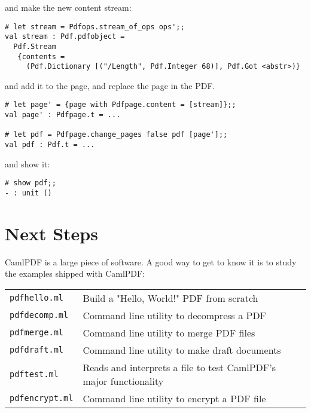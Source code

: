 \documentclass[a4paper]{memoir}
\newcommand{\smallgap}{\vspace{4mm}}
\begin{document}
\noindent and make the new content stream:

\begin{framed}
\small\begin{verbatim}
# let stream = Pdfops.stream_of_ops ops';;
val stream : Pdf.pdfobject =
  Pdf.Stream
   {contents =
     (Pdf.Dictionary [("/Length", Pdf.Integer 68)], Pdf.Got <abstr>)}
\end{verbatim}
\end{framed}

\noindent and add it to the page, and replace the page in the PDF.

\begin{framed}
\small\begin{verbatim}
# let page' = {page with Pdfpage.content = [stream]};;
val page' : Pdfpage.t = ...

# let pdf = Pdfpage.change_pages false pdf [page'];;
val pdf : Pdf.t = ...
\end{verbatim}
\end{framed}

\noindent and show it:

\begin{framed}
\small\begin{verbatim}
# show pdf;;
- : unit ()
\end{verbatim}
\end{framed}

\section*{Next Steps}

\noindent CamlPDF is a large piece of software. A good way to get to know it is to study the examples shipped with \textsf{CamlPDF}:
\smallgap

{\centering\small
\begin{tabular}{ll}
\texttt{pdfhello.ml} & Build a "Hello, World!" PDF from scratch\\
\texttt{pdfdecomp.ml} & Command line utility to decompress a PDF\\
\texttt{pdfmerge.ml} & Command line utility to merge PDF files\\
\texttt{pdfdraft.ml} & Command line utility to make draft documents\\
\texttt{pdftest.ml} & Reads and interprets a file to test CamlPDF's major functionality\\
\texttt{pdfencrypt.ml} & Command line utility to encrypt a PDF file\\
\end{tabular}
}
\end{document}
